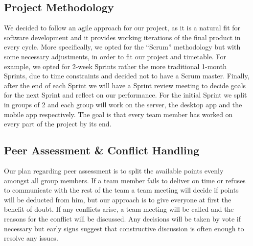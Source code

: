 \documentclass[11pt]{article}
\begin{document}
\subsection{Project Methodology}
We decided to follow an agile approach for our project, as it is a natural fit for software development and it provides working iterations of the final product in every cycle. More specifically, we opted for the “Scrum” methodology but with some necessary adjustments, in order to fit our project and timetable. For example, we opted for 2-week Sprints rather the more traditional 1-month Sprints, due to time constraints and decided not to have a Scrum master. Finally, after the end of each Sprint we will have a Sprint review meeting to decide goals for the next Sprint and reflect on our performance. For the initial Sprint we split in groups of 2 and each group will work on the server, the desktop app and the mobile app respectively. The goal is that every team member has worked on every part of the project by its end.
	
\subsection{Peer Assessment \& Conflict Handling}
Our plan regarding peer assessment is to split the available points evenly amongst all group members. If a team member fails to deliver on time or refuses to communicate with the rest of the team a team meeting will decide if points will be deducted from him, but our approach is to give everyone at first the benefit of doubt. If any conflicts arise, a team meeting will be called and the reasons for the conflict will be discussed. Any decisions will be taken by vote if necessary but early signs suggest that constructive discussion is often enough to resolve any issues.  

\end{document}
